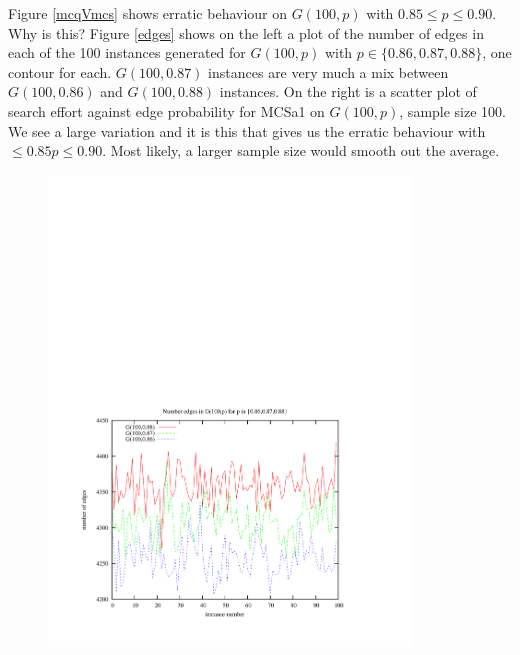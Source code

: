 \documentclass{l4proj}
\begin{document}
Figure \ref{mcqVmcs} shows erratic behaviour on $G(100,p)$ with $0.85 \leq p \leq 0.90$. Why is this? Figure \ref{edges}
shows on the left a plot of the number of edges in each of the 100 instances generated for $G(100,p)$ with $p \in \{0.86,0.87,0.88\}$,
one contour for each. $G(100,0.87)$ instances are very much a mix between $G(100,0.86)$ and $G(100,0.88)$ instances. On the right 
is a scatter plot of search effort against edge probability for MCSa1 on $G(100,p)$, sample size 100. We see a large variation
and it is this that gives us the erratic behaviour with $\leq 0.85 p \leq 0.90$. Most likely, a larger
sample size would smooth out the average.

\begin{figure}
\vspace{-6cm}
\begin{center}
\hspace{-1.5cm}
\begin{minipage}[t]{0.49\textwidth}
\includegraphics[height=12.5cm]{edges-100.pdf}
\end{minipage}
\hfill
\begin{minipage}[t]{0.49\textwidth}

\end{minipage}
\end{center}
\end{figure}
\end{document}
